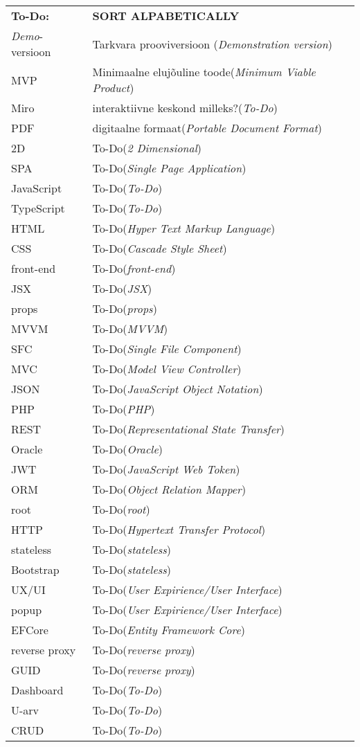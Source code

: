 \begin{longtable}{p{3cm}p{10cm}}
\textbf{To-Do:}&\textbf{SORT ALPABETICALLY}\\
\textit{Demo}-versioon&Tarkvara prooviversioon (\emph{Demonstration version})\\
MVP&Minimaalne elujõuline toode(\emph{Minimum Viable Product})\\
Miro&interaktiivne keskond milleks?(\emph{To-Do})\\
PDF&digitaalne formaat(\emph{Portable Document Format})\\
2D&To-Do(\emph{2 Dimensional})\\
SPA&To-Do(\emph{Single Page Application})\\
JavaScript&To-Do(\emph{To-Do})\\
TypeScript&To-Do(\emph{To-Do})\\
HTML&To-Do(\emph{Hyper Text Markup Language})\\
CSS&To-Do(\emph{Cascade Style Sheet})\\
front-end&To-Do(\emph{front-end})\\
JSX&To-Do(\emph{JSX})\\
props&To-Do(\emph{props})\\
MVVM&To-Do(\emph{MVVM})\\
SFC&To-Do(\emph{Single File Component})\\
MVC&To-Do(\emph{Model View Controller})\\
JSON&To-Do(\emph{JavaScript Object Notation})\\
PHP&To-Do(\emph{PHP})\\
REST&To-Do(\emph{Representational State Transfer})\\
Oracle&To-Do(\emph{Oracle})\\
JWT&To-Do(\emph{JavaScript Web Token})\\
ORM&To-Do(\emph{Object Relation Mapper})\\
root&To-Do(\emph{root})\\
HTTP&To-Do(\emph{Hypertext Transfer Protocol})\\
stateless&To-Do(\emph{stateless})\\
Bootstrap&To-Do(\emph{stateless})\\
UX/UI&To-Do(\emph{User Expirience/User Interface})\\
popup&To-Do(\emph{User Expirience/User Interface})\\
EFCore&To-Do(\emph{Entity Framework Core})\\
reverse proxy&To-Do(\emph{reverse proxy})\\
GUID&To-Do(\emph{reverse proxy})\\
Dashboard&To-Do(\emph{To-Do})\\
U-arv&To-Do(\emph{To-Do})\\
CRUD&To-Do(\emph{To-Do})\\


\end{longtable}
\addtocounter{table}{-1} 